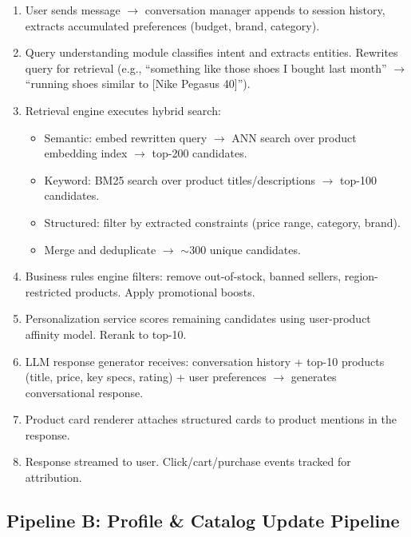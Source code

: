 \begin{enumerate}
  \item User sends message $\rightarrow$ conversation manager appends to session history, extracts accumulated preferences (budget, brand, category).
  \item Query understanding module classifies intent and extracts entities. Rewrites query for retrieval (e.g., ``something like those shoes I bought last month'' $\rightarrow$ ``running shoes similar to [Nike Pegasus 40]'').
  \item Retrieval engine executes hybrid search:
    \begin{itemize}
      \item Semantic: embed rewritten query $\rightarrow$ ANN search over product embedding index $\rightarrow$ top-200 candidates.
      \item Keyword: BM25 search over product titles/descriptions $\rightarrow$ top-100 candidates.
      \item Structured: filter by extracted constraints (price range, category, brand).
      \item Merge and deduplicate $\rightarrow$ $\sim$300 unique candidates.
    \end{itemize}
  \item Business rules engine filters: remove out-of-stock, banned sellers, region-restricted products. Apply promotional boosts.
  \item Personalization service scores remaining candidates using user-product affinity model. Rerank to top-10.
  \item LLM response generator receives: conversation history + top-10 products (title, price, key specs, rating) + user preferences $\rightarrow$ generates conversational response.
  \item Product card renderer attaches structured cards to product mentions in the response.
  \item Response streamed to user. Click/cart/purchase events tracked for attribution.
\end{enumerate}

\subsection*{Pipeline B: Profile \& Catalog Update Pipeline}

